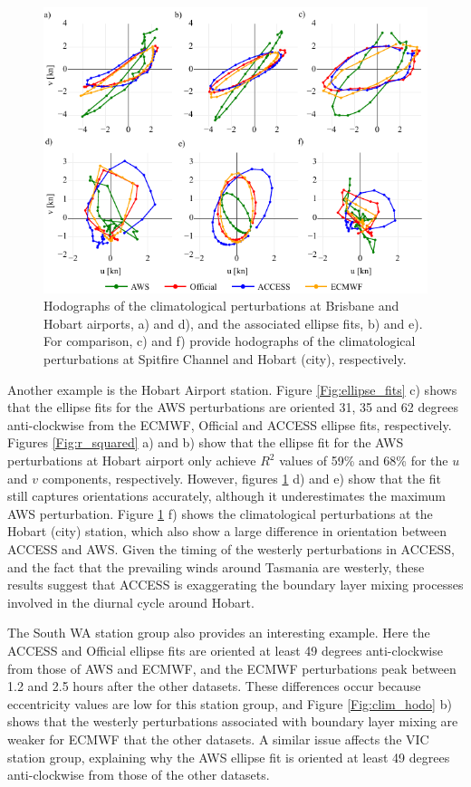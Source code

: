 \documentclass[twocol]{ametsoc}
\begin{document}
\begin{figure}
\centering
\includegraphics[width=39pc]{ellipse_hodo.pdf}
\caption{Hodographs of the climatological perturbations at Brisbane and Hobart airports, a) and d), and the associated ellipse fits, b) and e). For comparison, c) and f) provide hodographs of the climatological perturbations at Spitfire Channel and Hobart (city), respectively.}
\label{Fig:ellipse_hodo}
\end{figure}

Another example is the Hobart Airport station. Figure \ref{Fig:ellipse_fits} c) shows that the ellipse fits for the AWS perturbations are oriented 31, 35 and 62 degrees anti-clockwise from the ECMWF, Official and ACCESS ellipse fits, respectively. Figures \ref{Fig:r_squared} a) and b) show that the ellipse fit for the AWS perturbations at Hobart airport only achieve $R^2$ values of 59\% and 68\% for the $u$ and $v$ components, respectively. However, figures \ref{Fig:ellipse_hodo} d) and e) show that the fit still captures orientations accurately, although it underestimates the maximum AWS perturbation. Figure \ref{Fig:ellipse_hodo} f) shows the climatological perturbations at the Hobart (city) station, which also show a large difference in orientation between ACCESS and AWS. Given the timing of the westerly perturbations in ACCESS, and the fact that the prevailing winds around Tasmania are westerly, these results suggest that ACCESS is exaggerating the boundary layer mixing processes involved in the diurnal cycle around Hobart.

The South WA station group also provides an interesting example. Here the ACCESS and Official ellipse fits are oriented at least 49 degrees anti-clockwise from those of AWS and ECMWF, and the ECMWF perturbations peak between 1.2 and 2.5 hours after the other datasets. These differences occur because eccentricity values are low for this station group, and Figure \ref{Fig:clim_hodo} b) shows that the westerly perturbations associated with boundary layer mixing are weaker for ECMWF that the other datasets. A similar issue affects the VIC station group, explaining why the AWS ellipse fit is oriented at least 49 degrees anti-clockwise from those of the other datasets.  
\end{document}

